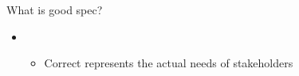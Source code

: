 
\begin{Slide}{What is good spec?}

\begin{itemize}
\item {}
\begin{itemize}
\item Correct \hfill represents the actual needs of stakeholders



\end{itemize}
\end{itemize}
\end{Slide}